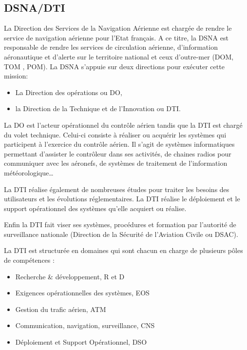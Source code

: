     \subsection{DSNA/DTI}
La Direction des Services de la Navigation Aérienne est chargée de rendre le service de navigation aérienne pour l’Etat français. A ce titre, la DSNA est responsable de rendre les services de circulation aérienne, d’information aéronautique et d’alerte sur le territoire national et ceux d’outre-mer (DOM, TOM , POM). La DSNA s’appuie sur deux directions pour exécuter cette mission:
\begin{itemize}
\item La Direction des opérations ou DO,
\item la Direction de la Technique et de l’Innovation ou DTI.
\end{itemize}
La DO est l’acteur opérationnel du contrôle aérien tandis que la DTI est chargé du volet technique. Celui-ci consiste à réaliser ou acquérir les systèmes qui participent à l’exercice du contrôle aérien. Il s’agit de systèmes informatiques permettant d’assister le contrôleur dans ses activités, de chaines radios pour communiquer avec les aéronefs, de systèmes de traitement de l’information météorologique…

La DTI réalise également de nombreuses études pour traiter les besoins des utilisateurs et les évolutions réglementaires. La DTI réalise le déploiement et le support opérationnel des systèmes qu’elle acquiert ou réalise. 

Enfin la DTI fait viser ses systèmes, procédures et formation par l’autorité de surveillance nationale (Direction de la Sécurité de l'Aviation Civile ou DSAC).

La DTI est structurée en domaines qui sont chacun en charge de plusieurs pôles de compétences :
\begin{itemize}
\item Recherche \& développement, R et D
\item Exigences opérationnelles des systèmes, EOS
\item Gestion du trafic aérien, ATM
\item Communication, navigation, surveillance, CNS
\item Déploiement et Support Opérationnel, DSO
\end{itemize}
